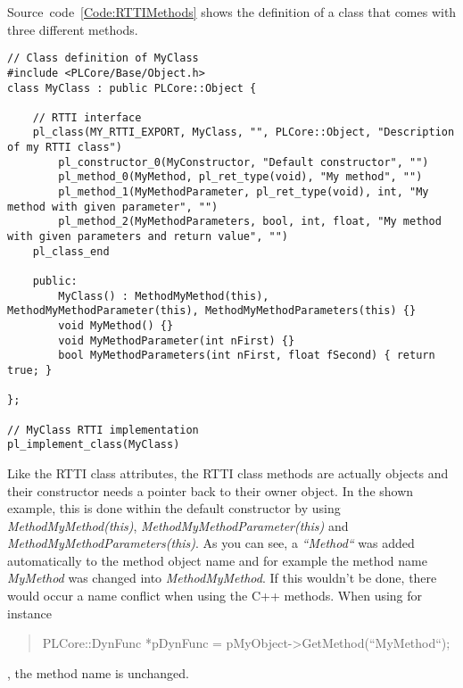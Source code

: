 Source~code~\ref{Code:RTTIMethods} shows the definition of a class that comes with three different methods.
\begin{lstlisting}[label=Code:RTTIMethods,caption={Definition of RTTI class methods with parameters}]
// Class definition of MyClass
#include <PLCore/Base/Object.h>
class MyClass : public PLCore::Object {

	// RTTI interface
	pl_class(MY_RTTI_EXPORT, MyClass, "", PLCore::Object, "Description of my RTTI class")
		pl_constructor_0(MyConstructor, "Default constructor", "")
		pl_method_0(MyMethod, pl_ret_type(void), "My method", "")
		pl_method_1(MyMethodParameter, pl_ret_type(void), int, "My method with given parameter", "")
		pl_method_2(MyMethodParameters, bool, int, float, "My method with given parameters and return value", "")
	pl_class_end

	public:
		MyClass() : MethodMyMethod(this), MethodMyMethodParameter(this), MethodMyMethodParameters(this) {}
		void MyMethod() {}
		void MyMethodParameter(int nFirst) {}
		bool MyMethodParameters(int nFirst, float fSecond) { return true; }

};

// MyClass RTTI implementation
pl_implement_class(MyClass)
\end{lstlisting}
Like the RTTI class attributes, the RTTI class methods are actually objects and their constructor needs a pointer back to their owner object. In the shown example, this is done within the default constructor by using \emph{MethodMyMethod(this)}, \emph{MethodMyMethodParameter(this)} and \emph{MethodMyMethodParameters(this)}. As you can see, a \emph{``Method``} was added automatically to the method object name and for example the method name \emph{MyMethod} was changed into \emph{MethodMyMethod}. If this wouldn't be done, there would occur a name conflict when using the C++ methods. When using for instance \begin{quote}PLCore::DynFunc *pDynFunc = pMyObject->GetMethod(``MyMethod``);\end{quote}, the method name is unchanged.

